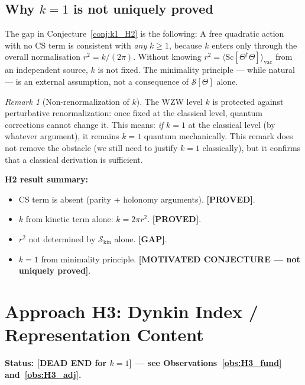\documentclass[11pt,a4paper]{article}
\theoremstyle{definition}
\theoremstyle{remark}
\newtheorem{remark}{Remark}
\begin{document}
\subsection{Why $k=1$ is not uniquely proved}

The gap in Conjecture~\ref{conj:k1_H2} is the following:
A free quadratic action with no CS term is consistent with
\emph{any} $k \geq 1$, because $k$ enters only through the overall
normalisation $r^2 = k/(2\pi)$.
Without knowing $r^2 = \langle\mathrm{Sc}[\Theta^\dagger\Theta]\rangle_\mathrm{vac}$
from an independent source, $k$ is not fixed.
The minimality principle — while natural — is an external assumption,
not a consequence of $\mathcal{S}[\Theta]$ alone.

\begin{remark}[Non-renormalization of $k$]
  \label{rem:nonrenorm}
  The WZW level $k$ is protected against perturbative renormalization:
  once fixed at the classical level, quantum corrections cannot change it.
  This means: \emph{if} $k = 1$ at the classical level (by whatever
  argument), it remains $k = 1$ quantum mechanically.
  This remark does not remove the obstacle (we still need to justify
  $k = 1$ classically), but it confirms that a classical derivation is
  sufficient.
\end{remark}

\textbf{H2 result summary:}
\begin{itemize}
  \item CS term is absent (parity + holonomy arguments).
    \textbf{[PROVED]}.
  \item $k$ from kinetic term alone: $k = 2\pi r^2$.
    \textbf{[PROVED]}.
  \item $r^2$ not determined by $\mathcal{S}_{\mathrm{kin}}$ alone.
    \textbf{[GAP]}.
  \item $k = 1$ from minimality principle.
    \textbf{[MOTIVATED CONJECTURE — not uniquely proved]}.
\end{itemize}

\section{Approach H3: Dynkin Index / Representation Content}
\label{sec:H3}

\textbf{Status: [DEAD END for $k=1$] — see Observations~\ref{obs:H3_fund}
and~\ref{obs:H3_adj}.}
\end{document}
